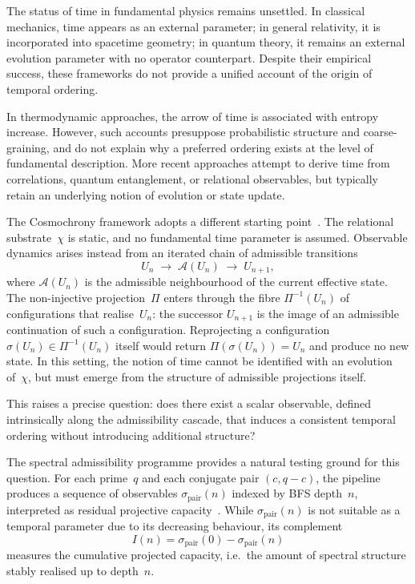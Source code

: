 \documentclass[11pt,a4paper]{article}
\begin{document}
  The status of time in fundamental physics remains unsettled.
  In classical mechanics, time appears as an external parameter; in
  general relativity, it is incorporated into spacetime geometry; in
  quantum theory, it remains an external evolution parameter with no
  operator counterpart.
  Despite their empirical success, these frameworks do not provide a
  unified account of the origin of temporal ordering.

  In thermodynamic approaches, the arrow of time is associated with
  entropy increase.
  However, such accounts presuppose probabilistic structure and
  coarse-graining, and do not explain why a preferred ordering exists at
  the level of fundamental description.
  More recent approaches attempt to derive time from correlations,
  quantum entanglement, or relational observables, but typically retain
  an underlying notion of evolution or state update.

  The Cosmochrony framework adopts a different starting point~\cite{Beau2026a}.
  The relational substrate~$\chi$ is static, and no fundamental time
  parameter is assumed.
  Observable dynamics arises instead from an iterated chain of admissible
  transitions~\cite{Beau2026m}
  \begin{equation}
    \label{eq:reprojection}
    U_n \;\longrightarrow\; \mathcal{A}(U_n) \;\longrightarrow\; U_{n+1},
  \end{equation}
  where $\mathcal{A}(U_n)$ is the admissible neighbourhood of the current
  effective state.
  The non-injective projection~$\Pi$ enters through the fibre $\Pi^{-1}(U_n)$
  of configurations that realise~$U_n$: the successor $U_{n+1}$ is the image of
  an admissible continuation of such a configuration.
  Reprojecting a configuration $\sigma(U_n) \in \Pi^{-1}(U_n)$ itself would
  return $\Pi(\sigma(U_n)) = U_n$ and produce no new state.
  In this setting, the notion of time cannot be identified with an
  evolution of~$\chi$, but must emerge from the structure of admissible
  projections itself.

  This raises a precise question: does there exist a scalar observable,
  defined intrinsically along the admissibility cascade, that induces a
  consistent temporal ordering without introducing additional structure?

  The spectral admissibility programme provides a natural testing ground
  for this question.
  For each prime~$q$ and each conjugate pair $(c, q{-}c)$, the pipeline
  produces a sequence of observables $\sigma_{\mathrm{pair}}(n)$ indexed
  by BFS depth~$n$, interpreted as residual projective
  capacity~\cite{Beau2026a29}.
  While $\sigma_{\mathrm{pair}}(n)$ is not suitable as a temporal
  parameter due to its decreasing behaviour, its complement
  \begin{equation}
    \label{eq:I_intro}
    I(n) = \sigma_{\mathrm{pair}}(0) - \sigma_{\mathrm{pair}}(n)
  \end{equation}
  measures the cumulative projected capacity, i.e.\ the amount of
  spectral structure stably realised up to depth~$n$.
\end{document}

